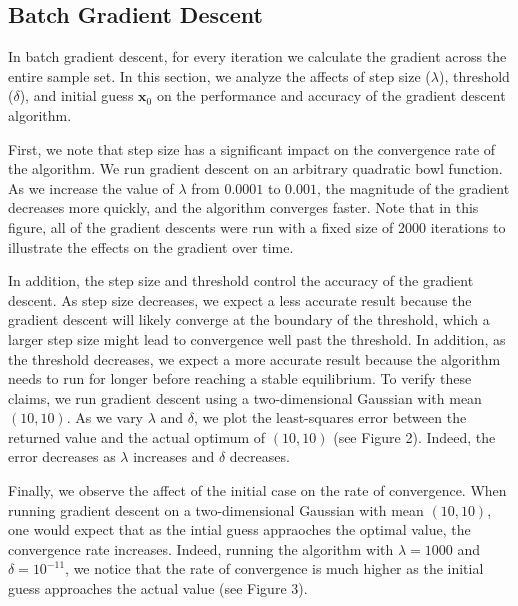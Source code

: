 \documentclass[10pt]{paper}
\begin{document}
\subsection{Batch Gradient Descent}

In batch gradient descent, for every iteration we calculate the gradient across the entire sample set. In this section, we analyze the affects of step size ($\lambda$), threshold ($\delta$), and initial guess $\mathbf{x}_{0}$ on the performance and accuracy of the gradient descent algorithm. 

First, we note that step size has a significant impact on the convergence rate of the algorithm. We run gradient descent on an arbitrary quadratic bowl function. As we increase the value of $\lambda$ from $0.0001$ to $0.001$, the magnitude of the gradient decreases more quickly, and the algorithm converges faster. Note that in this figure, all of the gradient descents were run with a fixed size of 2000 iterations to illustrate the effects on the gradient over time.


In addition, the step size and threshold control the accuracy of the gradient descent. As step size decreases, we expect a less accurate result because the gradient descent will likely converge at the boundary of the threshold, which a larger step size might lead to convergence well past the threshold. In addition, as the threshold decreases, we expect a more accurate result because the algorithm needs to run for longer before reaching a stable equilibrium. To verify these claims, we run gradient descent using a two-dimensional Gaussian with mean $(10, 10)$. As we vary $\lambda$ and $\delta$, we plot the least-squares error between the returned value and the actual optimum of $(10, 10)$ (see Figure 2). Indeed, the error decreases as $\lambda$ increases and $\delta$ decreases.

Finally, we observe the affect of the initial case on the rate of convergence. When running gradient descent on a two-dimensional Gaussian with mean $(10, 10)$, one would expect that as the intial guess appraoches the optimal value, the convergence rate increases. Indeed, running the algorithm with $\lambda = 1000$ and $\delta = 10^{-11}$, we notice that the rate of convergence is much higher as the initial guess approaches the actual value (see Figure 3). 
\end{document}
